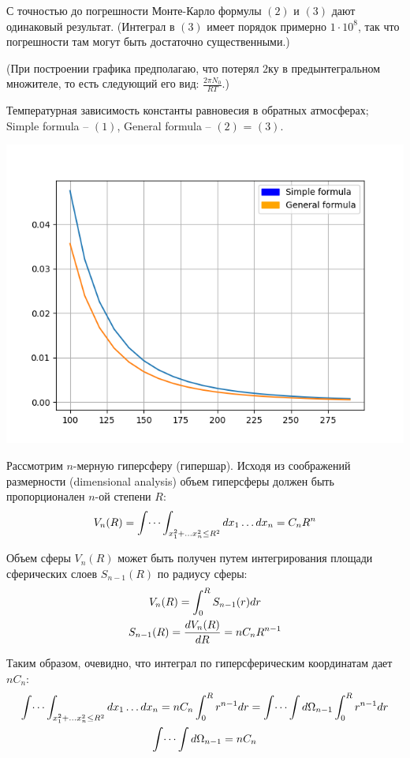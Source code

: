 \documentclass[14pt]{article}
\begin{document}
\vspace{0.3cm}
С точностью до погрешности Монте-Карло формулы $(2)$ и $(3)$ дают одинаковый результат. (Интеграл в $(3)$ имеет порядок примерно $1 \cdot 10^8$, так что погрешности там могут быть достаточно существенными.)

(При построении графика предполагаю, что потерял $2$ку в предынтегральном множителе, то есть следующий его вид: $\frac{2 \pi N_0}{RT}$.) 

Температурная зависимость константы равновесия в обратных атмосферах; Simple formula -- $(1)$, General formula -- $(2)$ = $(3)$.

\includegraphics[scale=1.0]{plot.png}

\newpage

Рассмотрим $n$-мерную гиперсферу (гипершар). Исходя из соображений размерности (dimensional analysis) объем гиперсферы должен быть пропорционален $n$-ой степени $R$:
\begin{gather}
	V_n (R) = \int \dots \int_{x_1^2 + \dots x_n^2 \leq R^2} dx_1 \dots dx_n = C_n R^n \notag
\end{gather}

Объем сферы $V_n(R)$ может быть получен путем интегрирования площади сферических слоев $S_{n-1}(R)$ по радиусу сферы:
\begin{gather}
	V_n(R) = \int_{0}^{R} S_{n-1}(r) dr \notag \\
	S_{n-1}(R) = \frac{d V_n(R)}{dR} = nC_n R^{n-1} \notag 
\end{gather}

Таким образом, очевидно, что интеграл по гиперсферическим координатам дает $nC_n$:
\begin{gather}
	\int \dots \int_{x_1^2 + \dots x_n^2 \leq R^2} dx_1 \dots dx_n = n C_n \int_{0}^{R} r^{n-1} dr = \int \dots \int d \Omega_{n-1} \int_{0}^{R} r^{n-1} dr \notag \\
	\int \dots \int d \Omega_{n-1} = n C_n \notag
\end{gather}
\end{document}
